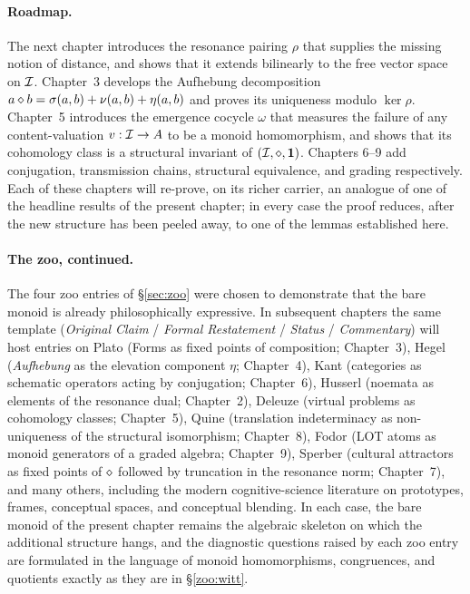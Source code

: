 \paragraph{Roadmap.}
The next chapter introduces the resonance pairing $\rho$ that supplies
the missing notion of distance, and shows that it extends bilinearly to
the free vector space on $\mathcal{I}$.  Chapter~3 develops the Aufhebung
decomposition $a \mathbin{\diamond} b = \sigma(a,b) + \nu(a,b) + \eta(a,b)$ and
proves its uniqueness modulo $\ker \rho$.  Chapter~5 introduces the
emergence cocycle $\omega$ that measures the failure of any
content-valuation $v : \mathcal{I} \to A$ to be a monoid homomorphism, and
shows that its cohomology class is a structural invariant of $(\mathcal{I},\mathbin{\diamond},\mathbf{1})$.
Chapters 6--9 add conjugation, transmission chains, structural
equivalence, and grading respectively.  Each of these chapters will
re-prove, on its richer carrier, an analogue of one of the headline
results of the present chapter; in every case the proof reduces, after
the new structure has been peeled away, to one of the lemmas established
here.

\paragraph{The zoo, continued.}
The four zoo entries of \S\ref{sec:zoo} were chosen to demonstrate that
the bare monoid is already philosophically expressive.  In subsequent
chapters the same template (\emph{Original Claim} / \emph{Formal
Restatement} / \emph{Status} / \emph{Commentary}) will host entries on
Plato (Forms as fixed points of composition; Chapter~3), Hegel
(\emph{Aufhebung} as the elevation component $\eta$; Chapter~4), Kant
(categories as schematic operators acting by conjugation; Chapter~6),
Husserl (noemata as elements of the resonance dual; Chapter~2),
Deleuze (virtual problems as cohomology classes; Chapter~5), Quine
(translation indeterminacy as non-uniqueness of the structural
isomorphism; Chapter~8), Fodor (LOT atoms as monoid generators of a
graded algebra; Chapter~9), Sperber (cultural attractors as fixed
points of $\mathbin{\diamond}$ followed by truncation in the resonance norm;
Chapter~7), and many others, including the modern cognitive-science
literature on prototypes, frames, conceptual spaces, and conceptual
blending.  In each case, the bare monoid of the present chapter remains
the algebraic skeleton on which the additional structure hangs, and the
diagnostic questions raised by each zoo entry are formulated in the
language of monoid homomorphisms, congruences, and quotients exactly as
they are in \S\ref{zoo:witt}.

